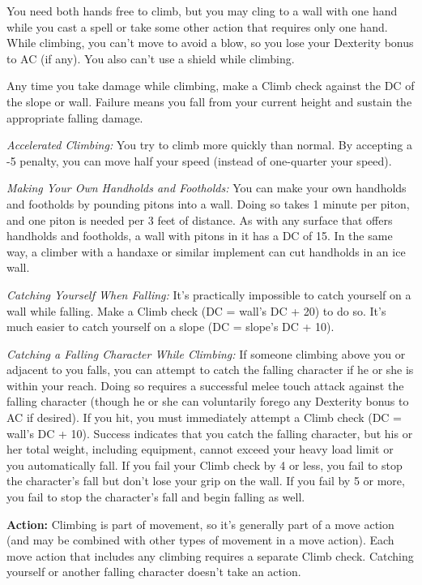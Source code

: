 You need both hands free to climb, but you may cling to a wall with one hand while you cast a spell or take some other action that requires only one hand. While climbing, you can’t move to avoid a blow, so you lose your Dexterity bonus to AC (if any). You also can’t use a shield while climbing.

Any time you take damage while climbing, make a Climb check against the DC of the slope or wall. Failure means you fall from your current height and sustain the appropriate falling damage.

\textit{Accelerated Climbing:} You try to climb more quickly than normal. By accepting a -5 penalty, you can move half your speed (instead of one-quarter your speed).

\textit{Making Your Own Handholds and Footholds:} You can make your own handholds and footholds by pounding pitons into a wall. Doing so takes 1 minute per piton, and one piton is needed per 3 feet of distance. As with any surface that offers handholds and footholds, a wall with pitons in it has a DC of 15. In the same way, a climber with a handaxe or similar implement can cut handholds in an ice wall.

\textit{Catching Yourself When Falling:} It’s practically impossible to catch yourself on a wall while falling. Make a Climb check (DC = wall’s DC + 20) to do so. It’s much easier to catch yourself on a slope (DC = slope’s DC + 10).

\textit{Catching a Falling Character While Climbing:} If someone climbing above you or adjacent to you falls, you can attempt to catch the falling character if he or she is within your reach. Doing so requires a successful melee touch attack against the falling character (though he or she can voluntarily forego any Dexterity bonus to AC if desired). If you hit, you must immediately attempt a Climb check (DC = wall’s DC + 10). Success indicates that you catch the falling character, but his or her total weight, including equipment, cannot exceed your heavy load limit or you automatically fall. If you fail your Climb check by 4 or less, you fail to stop the character’s fall but don’t lose your grip on the wall. If you fail by 5 or more, you fail to stop the character’s fall and begin falling as well.

\textbf{Action:} Climbing is part of movement, so it’s generally part of a move action (and may be combined with other types of movement in a move action). Each move action that includes any climbing requires a separate Climb check. Catching yourself or another falling character doesn’t take an action.

